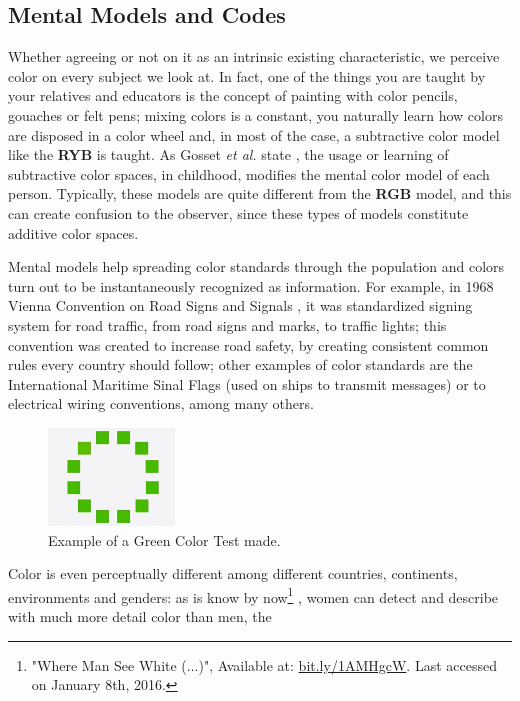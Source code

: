 \documentclass{report}
\begin{document}
\subsection{Mental Models and Codes}
Whether agreeing or not on it as an intrinsic existing characteristic, we perceive color on every
subject we look at. In fact, one of the things you are taught by your relatives and educators is the concept of
painting with color pencils, gouaches or felt pens; mixing colors is a constant,
you naturally learn how colors are disposed in a color wheel and, in most of the case, a subtractive color
model like the \textbf{RYB} is taught. As Gosset \emph{et al.} state \cite{Gossett2004}, the usage or learning of
subtractive color spaces, in childhood, modifies the mental color model of each person. Typically, these models are quite
different from the \textbf{RGB} model, and this can create confusion to
the observer, since these types of models constitute additive color spaces. \par
Mental models help spreading color standards through the population and colors turn out to be instantaneously
recognized as information. For example, in 1968 Vienna Convention on Road Signs and Signals \cite{Nations1995}, it was standardized signing system for road traffic, from road signs and marks, to traffic lights;
this convention was created to increase road safety, by creating consistent common rules every country
should follow; other examples of color standards are the International Maritime Sinal Flags
\cite{Agency2003} (used on ships to transmit messages) or to electrical wiring conventions, among many others. \par
%
\begin{figure}
	\centering
    \vspace{-\baselineskip}
    \includegraphics[width=0.3\textwidth]{Himba_green-color-ring.jpg}
    \caption[Himba Test: Green Color Ring]{Example of a Green Color Test made.\protect\footnotemark[10]}
    \label{fig:himba}
\end{figure}
%
Color is even perceptually different among different countries, continents, environments and genders:
as is know by now\footnote{"Where Man See White (...)", Available at: 
\url {bit.ly/1AMHgcW}.
Last accessed on January 8th, 2016.} \cite{Ginter2011}, women can detect and describe with much more detail color than men, the
\end{document}
